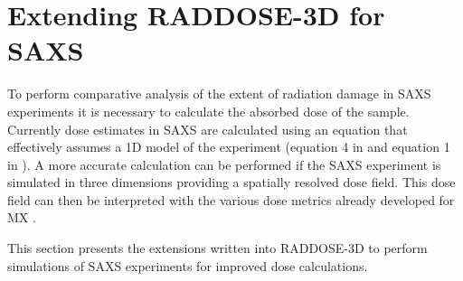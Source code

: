 \section{Extending RADDOSE-3D for SAXS}
\label{sec:Extending RADDOSE-3D for SAXS}
To perform comparative analysis of the extent of radiation damage in SAXS experiments it is necessary to calculate the absorbed dose of the sample.
Currently dose estimates in SAXS are calculated using an equation that effectively assumes a 1D model of the experiment (equation 4 in \cite{meisburger2013breaking} and equation 1 in \cite{jeffries2015limiting}).
A more accurate calculation can be performed if the SAXS experiment is simulated in three dimensions providing a spatially resolved dose field.
This dose field can then be interpreted with the various dose metrics already developed for MX \cite{zeldin2013dwd,zeldin2012}.

This section presents the extensions written into RADDOSE-3D to perform simulations of SAXS experiments for improved dose calculations.

